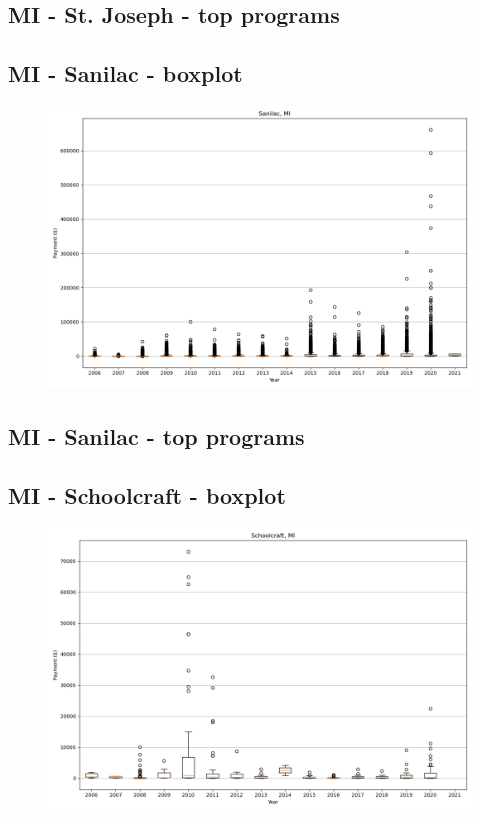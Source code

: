 \subsection*{MI - St. Joseph - top programs}

\newpage
\subsection*{MI - Sanilac - boxplot}
\begin{figure}[h]
\centering
\includegraphics[width=7in]{../output/boxplots/counties/Sanilac-MI_boxplot.png}
\end{figure}


\subsection*{MI - Sanilac - top programs}

\newpage
\subsection*{MI - Schoolcraft - boxplot}
\begin{figure}[h]
\centering
\includegraphics[width=7in]{../output/boxplots/counties/Schoolcraft-MI_boxplot.png}
\end{figure}


